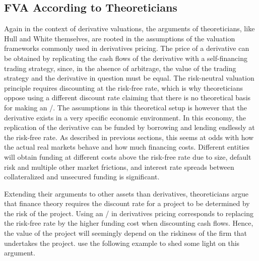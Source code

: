 \documentclass[main.tex]{subfiles}
\begin{document}
        \subsection{FVA According to Theoreticians}
            Again in the context of derivative valuations, 
            the arguments of theoreticians, like Hull and White themselves, 
            are rooted in the assumptions of the valuation frameworks commonly used in derivatives pricing.
            The price of a derivative can be obtained by replicating the cash flows of the derivative 
            with a self-financing trading strategy, since, in the absence of arbitrage, 
            the value of the trading strategy and the derivative in question must be equal.
            The risk-neutral valuation principle requires discounting at the risk-free rate,
            which is why theoreticians oppose using a different discount rate
            claiming that there is no theoretical basis for making an \FVA/.
            The assumptions in this theoretical setup is however 
            that the derivative exists in a very specific economic environment. 
            In this economy, the replication of the derivative
            can be funded by borrowing and lending endlessly at the risk-free rate.
            As described in previous sections,
            this seems at odds with how the actual real markets behave and how much financing costs.
            Different entities will obtain funding at different costs above the risk-free rate due to size,
            default risk and multiple other market frictions,
            and interest rate spreads between collateralized and unsecured funding is significant.

            Extending their arguments to other assets than derivatives, 
            theoreticians argue that finance theory requires the discount rate for a project 
            to be determined by the risk of the project.
            Using an \FVA/ in derivatives pricing corresponds to replacing the risk-free rate by the higher funding cost
            when discounting cash flows.
            Hence, the value of the project will seemingly depend on the riskiness of the firm that undertakes the project.
            \textcite{HullWhite2012FVA} use the following example to shed some light on this argument.
\end{document}
